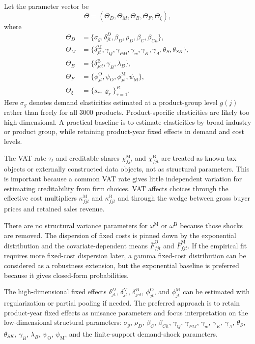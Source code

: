 \documentclass[11pt,a4paper]{article}
\newcommand{\M}{\mathrm{M}}
\newcommand{\B}{\mathrm{B}}
\newcommand{\OFC}{\mathrm{O}}
\begin{document}
Let the parameter vector be
\begin{equation}
    \Theta=
    \left(
        \Theta_D,
        \Theta_M,
        \Theta_B,
        \Theta_F,
        \Theta_\xi
    \right),
\end{equation}
where
\begin{align}
    \Theta_D&=\{\sigma_g,\delta^D_{jt},\beta_D,\rho_D,\beta_C,\beta_{Ch}\},\\
    \Theta_M&=\{\delta^{\M}_{jt},\gamma_Q,\gamma_{PM},\gamma_w,\gamma_K,\gamma_A,\theta_S,\theta_{SK}\},\\
    \Theta_B&=\{\delta^{\B}_{jct},\gamma_B,\lambda_B\},\\
    \Theta_F&=\{\phi^{\OFC}_{jt},\psi_{\OFC},\phi^{\M}_{jt},\psi_{\M}\},\\
    \Theta_\xi&=\{s_r,\varrho_r\}_{r=1}^{R}.
\end{align}
Here $\sigma_g$ denotes demand elasticities estimated at a product-group level $g(j)$ rather than freely for all 3000 products. Product-specific elasticities are likely too high-dimensional. A practical baseline is to estimate elasticities by broad industry or product group, while retaining product-year fixed effects in demand and cost levels.

The VAT rate $\tau_t$ and creditable shares $\chi^{\M}_{fjt}$ and $\chi^{\B}_{fjt}$ are treated as known tax objects or externally constructed data objects, not as structural parameters. This is important because a common VAT rate gives little independent variation for estimating creditability from firm choices. VAT affects choices through the effective cost multipliers $\kappa^{\M}_{fjt}$ and $\kappa^{\B}_{fjt}$ and through the wedge between gross buyer prices and retained sales revenue.

There are no structural variance parameters for $\omega^{\M}$ or $\omega^{\B}$ because those shocks are removed. The dispersion of fixed costs is pinned down by the exponential distribution and the covariate-dependent means $\bar F^{\OFC}_{fjt}$ and $\bar F^{\M}_{fjt}$. If the empirical fit requires more fixed-cost dispersion later, a gamma fixed-cost distribution can be considered as a robustness extension, but the exponential baseline is preferred because it gives closed-form probabilities.

The high-dimensional fixed effects $\delta^D_{jt}$, $\delta^{\M}_{jt}$, $\delta^B_{jct}$, $\phi^{\OFC}_{jt}$, and $\phi^{\M}_{jt}$ can be estimated with regularization or partial pooling if needed. The preferred approach is to retain product-year fixed effects as nuisance parameters and focus interpretation on the low-dimensional structural parameters: $\sigma_g$, $\rho_D$, $\beta_C$, $\beta_{Ch}$, $\gamma_Q$, $\gamma_{PM}$, $\gamma_w$, $\gamma_K$, $\gamma_A$, $\theta_S$, $\theta_{SK}$, $\gamma_B$, $\lambda_B$, $\psi_{\OFC}$, $\psi_{\M}$, and the finite-support demand-shock parameters.
\end{document}
